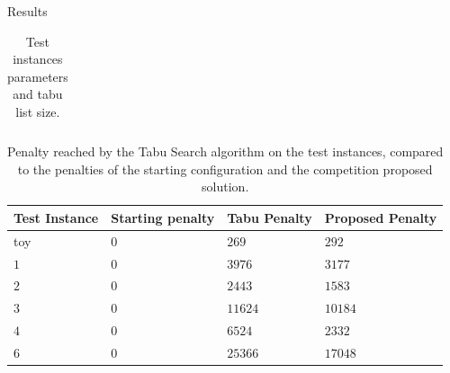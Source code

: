 \begin{section}{Results}
\begin{table}[h]
\begin{tabular}{lllllllll}
     \end{tabular}
     \caption{Test instances parameters and tabu list size.}
     \label{tab:parameters}
 \end{table}
 \begin{table}[h]
     \centering
     \begin{tabular}{llll}
         \hline
         \textbf{Test Instance} & \textbf{Starting penalty} & \textbf{Tabu Penalty} & \textbf{Proposed Penalty} \\ \hline
         toy                    & $0$                       & $269$                 & $292$                     \\
         $1$                    & $0$                       & $3976$                & $3177$                    \\
         $2$                    & $0$                       & $2443$                & $1583$                    \\
         $3$                    & $0$                       & $11624$               & $10184$                   \\
         $4$                    & $0$                       & $6524$                & $2332$                    \\
         $6$                    & $0$                       & $25366$               & $17048$                   \\
     \end{tabular}
     \caption{Penalty reached by the Tabu Search algorithm on the test instances, compared to the
         penalties of the starting configuration and the competition proposed solution.}
     \label{tab:penalties}
 \end{table}


\end{section}
